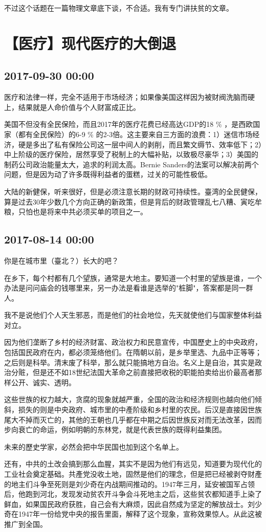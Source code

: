 \documentclass[twocolumn]{ctexart}
\begin{document}
不过这个话题在一篇物理文章底下谈，不合适。我有专门讲扶贫的文章。\section*{【医疗】现代医疗的大倒退}
\subsection*{2017-09-30 00:00}
医疗和法律一样，完全不适用于市场经济；如果像美国这样因为被财阀洗脑而硬上，结果就是人命价值与个人财富成正比。

美国不但没有全民保险，而且2017年的医疗花费已经高达GDP的18 \% ，是西欧国家（都有全民保险）的6-9 \% 的2-3倍。这主要来自三方面的浪费：1）迷信市场经济，硬是多出了私有保险公司这一层中间人的剥削，而且繁文缛节、效率低下；2）中上阶级的医疗保险，居然享受了税制上的大幅补贴，以致极尽豪华；3）美国的制药公司政治能量太大，追求的利润太高。Bernie Sanders的法案可以解决前两个问题，但是因为动了许多既得利益者的蛋糕，过关的可能性极低。

大陆的新健保，听来很好，但是必须注意长期的财政可持续性。臺湾的全民健保，算是过去30年少数几个方向正确的新政策，但是背后的财政管理乱七八糟、寅吃牟粮，只怕也是将来中共必须买单的项目之一。\subsection*{2017-08-14 00:00}
你是在城市里（臺北？）长大的吧？

在乡下，每个村都有几个望族，通常是大地主。要知道一个村里的望族是谁，一个办法是问问庙会的钱哪里来，另一办法是看谁是选举的"桩脚"，答案都是同一群人。

我不是说他们个人天生邪恶，而是他们的社会地位，先天就使他们与国家整体利益对立。

因为他们垄断了乡村的经济财富、政治权力和民意宣传，中国歷史上的中央政府，包括国民政府在内，都必须笼络他们。在隋朝以前，是乡举里选、九品中正等等；之后则是科举。清末废了科举，那么就只能搞地方自治。名义上是自治，其实是政治分赃，但是还不如18世纪法国大革命之前直接把收税的职能拍卖给出价最高者那样公开、诚实、透明。

这些世族的权力越大，贪腐的现象就越严重，全国的政治和经济规则也越向他们倾斜，损失的则是中央政府、城市里的中產阶级和乡村里的农民。后汉是直接因世族尾大不掉而灭亡的，其他的王朝也几乎都在中期之后因世族反对而无法改革，因而步向衰亡的命运，例如明朝的东林党，就是代表世族的既得利益集团。

未来的歷史学家，必然会把中华民国也加到这个名单上。

还有，中共的土改会搞到那么血腥，其实不是因为他们有远见，知道要为现代化的工业社会奠定基础。共產党没收土地，固然是他们的理念，但是把已经被剥夺财產的地主们斗争至死则是刘少奇在内战期间推动的。1947年三月，延安被国军占领后，他跑到河北，发现发动贫农开斗争会斗死地主之后，这些贫农都知道手上染了鲜血，如果国民政府获胜，自己会有大麻烦，因此自然成为坚定的解放战士。刘少奇在1947年一份给党中央的报告里面，解释了这个现象，宣称效果惊人。从此这被推广到全国。
\end{document}
